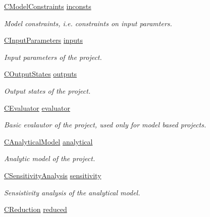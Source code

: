 \begin{DoxyCompactItemize}
\hyperlink{class_go_s_u_m_1_1_c_model_constraints}{C\-Model\-Constraints} \hyperlink{class_go_s_u_m_1_1_c_container_a73819357a0ef4d28c921ae3562a21246}{inconsts}
\begin{DoxyCompactList}\small\item\em Model constraints, i.\-e. constraints on input paramters. \end{DoxyCompactList}\item 
\hyperlink{class_go_s_u_m_1_1_c_input_parameters}{C\-Input\-Parameters} \hyperlink{class_go_s_u_m_1_1_c_container_a0ca8dbcc826a7c66fb42a11b5b22e7b8}{inputs}
\begin{DoxyCompactList}\small\item\em Input parameters of the project. \end{DoxyCompactList}\item 
\hyperlink{class_go_s_u_m_1_1_c_output_states}{C\-Output\-States} \hyperlink{class_go_s_u_m_1_1_c_container_a3312afd03c8b6cfd72d46961a9afa136}{outputs}
\begin{DoxyCompactList}\small\item\em Output states of the project. \end{DoxyCompactList}\item 
\hyperlink{class_go_s_u_m_1_1_c_evaluator}{C\-Evaluator} \hyperlink{class_go_s_u_m_1_1_c_container_a230d7ca9d852616927abc46264a4c5e3}{evaluator}
\begin{DoxyCompactList}\small\item\em Basic evalautor of the project, used only for model based projects. \end{DoxyCompactList}\item 
\hyperlink{class_go_s_u_m_1_1_c_analytical_model}{C\-Analytical\-Model} \hyperlink{class_go_s_u_m_1_1_c_container_a9c745a3812f9974c0038a8e22769963c}{analytical}
\begin{DoxyCompactList}\small\item\em Analytic model of the project. \end{DoxyCompactList}\item 
\hyperlink{class_go_s_u_m_1_1_c_sensitivity_analysis}{C\-Sensitivity\-Analysis} \hyperlink{class_go_s_u_m_1_1_c_container_a8c0bf21d8d7f30490a79e63ac9a342e1}{sensitivity}
\begin{DoxyCompactList}\small\item\em Sensistivity analysis of the analytical model. \end{DoxyCompactList}\item 
\hyperlink{class_go_s_u_m_1_1_c_reduction}{C\-Reduction} \hyperlink{class_go_s_u_m_1_1_c_container_a6df9da86ba89c203d7a4b8aacaabf45c}{reduced}

\end{DoxyCompactItemize}
